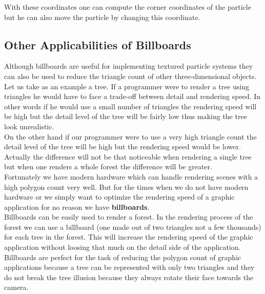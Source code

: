 With these coordinates one can compute the corner coordinates of the particle but he can also move the particle by changing this coordinate.\\


\newpage
\subsection{Other Applicabilities of Billboards}
Although billboards are useful for implementing textured particle systems they can also be used to reduce the triangle count of other three-dimensional objects.\\

Let us take as an example a tree. If a programmer were to render a tree using triangles he would have to face a trade-off between detail and rendering speed. In other words if he would use a small number of triangles the rendering speed will be high but the detail level of the tree will be fairly low thus making the tree look unrealistic.\\

On the other hand if our programmer were to use a very high triangle count the detail level of the tree will be high but the rendering speed would be lower. Actually the difference will not be that noticeable when rendering a single tree but when one renders a whole forest the difference will be greater.\\

Fortunately we have modern hardware which can handle rendering scenes with a high polygon count very well. But for the times when we do not have modern hardware or we simply want to optimize the rendering speed of a graphic application for no reason we have \textbf{billboards}.\\

Billboards can be easily used to render a forest. In the rendering process of the forest we can use a billboard (one made out of two triangles not a few thousands) for each tree in the forest. This will increase the rendering speed of the graphic application without loosing that much on the detail side of the application.\\

Billboards are perfect for the task of reducing the polygon count of graphic applications because a tree can be represented with only two triangles and they do not break the tree illusion because they always rotate their face towards the camera.\\